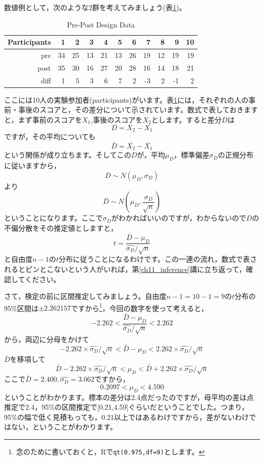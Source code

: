 \documentclass{ltjsbook}
\begin{document}
数値例として，次のような2群を考えてみましょう(表\ref{tbl:16_01})。
\begin{table}[ht]
	\centering
	\caption{Pre-Post Design Data}
	\begin{tabular}{rrrrrrrrrrr}
		\hline
		Participants & 1  & 2  & 3  & 4  & 5  & 6  & 7  & 8  & 9  & 10 \\
		\hline
		pre          & 34 & 25 & 13 & 21 & 13 & 26 & 19 & 12 & 19 & 19 \\
		post         & 35 & 30 & 16 & 27 & 20 & 28 & 16 & 14 & 18 & 21 \\ \hline
		diff         & 1  & 5  & 3  & 6  & 7  & 2  & -3 & 2  & -1 & 2  \\
		\hline
	\end{tabular}
	\label{tbl:16_01}
\end{table}
ここには10人の実験参加者(participants)がいます。表\ref{tbl:16_01}には，それぞれの人の事前・事後のスコアと，その差分について示されています。数式で表しておきますと，まず事前のスコアを$X_1$,事後のスコアを$X_2$とします。すると差分$D$は
\[ D = X_2 - X_1 \]
ですが，その平均についても
\[ \bar{D} = \bar{X_2} - \bar{X_1} \]
という関係が成り立ちます。そしてこの$D$が，平均$\mu_D$，標準偏差$\sigma_D$の正規分布に従いますから，
\[ D \sim N(\mu_D,\sigma_D)\]
より
\[ \bar{D} \sim N(\mu_D,\frac{\sigma_D}{\sqrt{n}}) \]
ということになります。ここで$\sigma_D$がわかればいいのですが，わからないので$D$の不偏分散をその推定値としますと，
\[ t = \frac{\bar{D}-\mu_D}{\hat{\sigma_D}/\sqrt{n}} \]
と自由度$n-1$の$t$分布に従うことになるわけです。この一連の流れ，数式で表されるとピンとこないという人がいれば，第\ref{ch11_inference}講に立ち返って，確認してください。

さて，検定の前に区間推定してみましょう。自由度$n-1=10-1=9$の$t$分布の95\%区間は$\pm 2.262157$ですから\footnote{念のために書いておくと，Rで\texttt{qt(0.975,df=9)}とします。}，今回の数字を使って考えると，
\[ -2.262 < \frac{\bar{D}-\mu_D}{\hat{\sigma_D}/\sqrt{n}} < 2.262 \]
から，両辺に分母をかけて
\[ -2.262 \times \hat{\sigma_D}/\sqrt{n} < \bar{D}-\mu_D < 2.262 \times \hat{\sigma_D}/\sqrt{n} \]
$\bar{D}$を移項して
\[ \bar{D}-2.262 \times \hat{\sigma_D}/\sqrt{n} < \mu_D < \bar{D}+2.262\times \hat{\sigma_D}/\sqrt{n} \]
ここで$\bar{D} = 2.400,\hat{\sigma_D} = 3.062$ですから，
\[ 0.2097 < \mu_D < 4.590 \]
ということがわかります。標本の差分は2.4点だったのですが，母平均の差は点推定で2.4，95\%の区間推定で[0.21,4.59]ぐらいだということでした。つまり，95\%の幅で低く見積もっても，0.21以上ではあるわけですから，差がないわけではない，ということがわかります。
\end{document}
